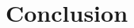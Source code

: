 \documentclass[conference]{IEEEtran}
\begin{document}
    \section{Conclusion}
    \label{sec:conclusion}

    \begin{thebibliography}{00}
    \end{thebibliography}
\end{document}
